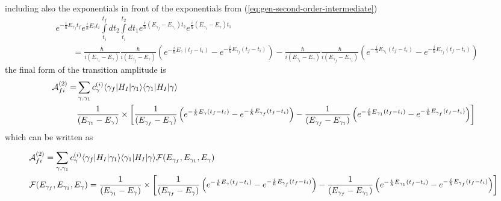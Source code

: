 including also the exponentials in front of the exponentials from (\ref{eq:gen-second-order-intermediate})
\begin{align}
    & e^{-\frac{i}{\hbar}E_{\gamma_f} t_f}e^{\frac{i}{\hbar}E_{\gamma} t_i}\int\limits_{t_i}^{t_f}dt_2\int\limits_{t_i}^{t_2}dt_1e^{\frac{i}{\hbar}(E_{\gamma_f}-E_{\gamma_1})t_2}e^{\frac{i}{\hbar}(E_{\gamma_1}-E_{\gamma})t_1}\nonumber                                                                                                                                      \\
    & \qquad =\frac{\hbar}{i(E_{\gamma_1}-E_{\gamma})}\frac{\hbar}{i(E_{\gamma_f}-E_{\gamma})}\left(e^{-\frac{i}{\hbar}E_{\gamma}(t_f-t_i)}-e^{-\frac{i}{\hbar}E_{\gamma_f}(t_f-t_i)}\right)-\frac{\hbar}{i(E_{\gamma_1}-E_{\gamma})}\frac{\hbar}{i(E_{\gamma_f}-E_{\gamma_1})}\left(e^{-\frac{i}{\hbar}E_{\gamma_1}(t_f-t_i)}-e^{-\frac{i}{\hbar}E_{\gamma_f}(t_f-t_i)}\right)
\end{align}
the final form of the transition amplitude is
\begin{align}
    {\cal A}_{fi}^{(2)} = & \sum_{\gamma, \gamma_1} c_{\gamma}^{(i)}\langle\gamma_f|H_I|\gamma_1\rangle \langle\gamma_1|H_I|\gamma\rangle\nonumber                                                                                                                                                                  \\
    & \frac{1}{(E_{\gamma_1}-E_{\gamma})} \times\left[ \frac{1}{(E_{\gamma_f}-E_{\gamma})}\left(e^{-\frac{i}{\hbar}E_{\gamma}(t_f-t_i)}-e^{-\frac{i}{\hbar}E_{\gamma_f}(t_f-t_i)}\right)-\frac{1}{(E_{\gamma_f}-E_{\gamma_1})}\left(e^{-\frac{i}{\hbar}E_{\gamma_1}(t_f-t_i)}-e^{-\frac{i}{\hbar}E_{\gamma_f}(t_f-t_i)}\right) \right]
\end{align}
which can be written as
\begin{importantbox}
    \begin{align}
        &{\cal A}_{fi}^{(2)} =  \sum_{\gamma, \gamma_1} c_{\gamma}^{(i)}\langle\gamma_f|H_I|\gamma_1\rangle \langle\gamma_1|H_I|\gamma\rangle{\cal F}(E_{\gamma_f}, E_{\gamma_1},E_\gamma)\nonumber                                                                                                                                                                  \\
        & {\cal F}(E_{\gamma_f}, E_{\gamma_1},E_\gamma) = \frac{1}{(E_{\gamma_1}-E_{\gamma})} \times\left[ \frac{1}{(E_{\gamma_f}-E_{\gamma})}\left(e^{-\frac{i}{\hbar}E_{\gamma}(t_f-t_i)}-e^{-\frac{i}{\hbar}E_{\gamma_f}(t_f-t_i)}\right)-\frac{1}{(E_{\gamma_f}-E_{\gamma_1})}\left(e^{-\frac{i}{\hbar}E_{\gamma_1}(t_f-t_i)}-e^{-\frac{i}{\hbar}E_{\gamma_f}(t_f-t_i)}\right) \right]\label{eq:gen-second-order-amplitude}
    \end{align}

\end{importantbox}